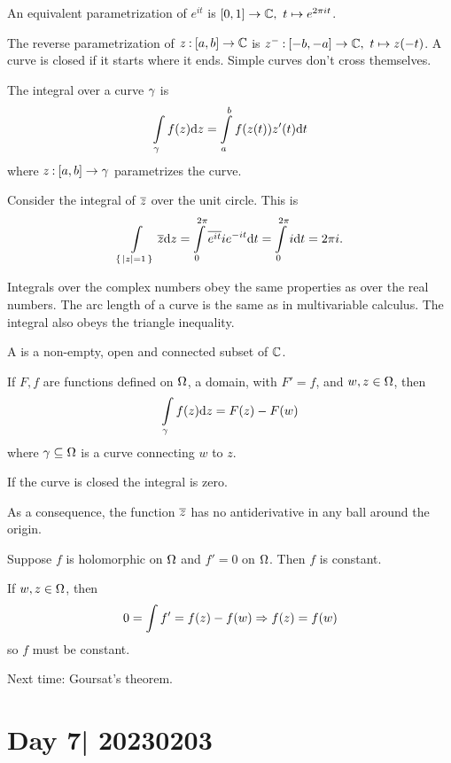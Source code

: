 \documentclass[12pt]{memoir}
\begin{document}
\begin{Ex}
    An equivalent parametrization of $e^{it}$ is $[0,1]\to\mathbb{C},\ t\mapsto e^{2\pi i t}$. 
\end{Ex}

The reverse parametrization of $z\mathbin{:}[a,b]\to\mathbb{C}$ is $z^-\mathbin{:}[-b,-a]\to\mathbb{C},\ t\mapsto z(-t)$. A curve is closed if it starts where it ends. Simple curves don't cross themselves.

\begin{Def}
    The integral over a curve $\gamma$ is 
    $$\int\limits_\gamma f(z)\dd z=\int\limits_a^bf(z(t))z'(t)\dd t$$
    where $z\mathbin{:}[a,b]\to\gamma$ parametrizes the curve.
\end{Def}

\begin{Ex}
    Consider the integral of $\overline z$ over the unit circle. This is 
    $$\int\limits_{\{\,|z|=1\,\}}\overline z\dd z=\int\limits_0^{2\pi}\overline{e^{it}}ie^{-it}\dd t=\int\limits_{0}^{2\pi}i\dd t=2\pi i.$$
\end{Ex}

Integrals over the complex numbers obey the same properties as over the real numbers. The arc length of a curve is the same as in multivariable calculus. The integral also obeys the triangle inequality.

\begin{Def}
    A  is a non-empty, open and connected subset of $\mathbb{C}$.
\end{Def}

\begin{Lem}
    If $F,f$ are functions defined on $\Omega$, a domain, with $F'=f$, and $w,z\in\Omega$, then 
    $$\int\limits_\gamma f(z)\dd z=F(z)-F(w)$$
    where $\gamma\subseteq\Omega$ is a curve connecting $w$ to $z$. 
\end{Lem}

\begin{Cor}
If the curve is closed the integral is zero.
\end{Cor}

As a consequence, the function $\overline z$ has no antiderivative in any ball around the origin. 

\begin{Lem}
    Suppose $f$ is holomorphic on $\Omega$ and $f'=0$ on $\Omega$. Then $f$ is constant.
\end{Lem}

\begin{ptcbp}
    If $w,z\in\Omega$, then 
    $$0=\int f'=f(z)-f(w)\Rightarrow f(z)=f(w)$$
    so $f$ must be constant.
\end{ptcbp}

Next time: Goursat's theorem.

\section{Day 7| 20230203}


\ifx\nextra\undefined
\printindex
\else\fi
\nocite{*}


\end{document}
